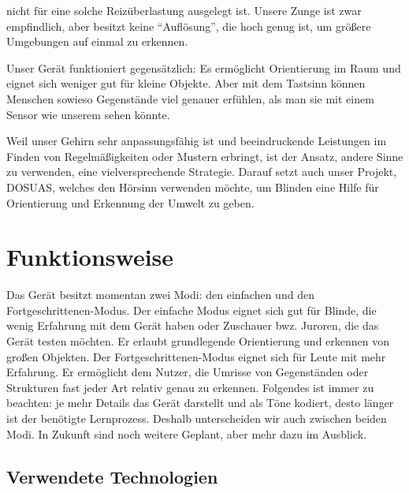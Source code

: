 \documentclass[a4paper,12pt,ngerman]{scrartcl}
\begin{document}
nicht für eine solche Reizüberlastung ausgelegt ist. Unsere Zunge ist zwar empfindlich, aber besitzt keine
\enquote{Auflösung}, die hoch genug ist, um größere Umgebungen auf einmal zu erkennen.\par 
Unser Gerät funktioniert gegensätzlich: Es ermöglicht 
Orientierung im Raum und eignet sich weniger gut für kleine Objekte. Aber mit dem Tastsinn können Menschen
sowieso Gegenstände viel genauer erfühlen, als man sie mit einem Sensor wie unserem sehen könnte.\par
Weil unser Gehirn sehr anpassungsfähig ist und beeindruckende
Leistungen im Finden von Regelmäßigkeiten oder Mustern erbringt, ist der Ansatz,
andere Sinne zu verwenden, eine vielversprechende Strategie. Darauf setzt auch 
unser Projekt, DOSUAS, welches den Hörsinn verwenden möchte, um Blinden eine Hilfe
für Orientierung und Erkennung der Umwelt zu geben.

\newpage

\section{Funktionsweise}

Das Gerät besitzt momentan zwei Modi: den einfachen und den Fortgeschrittenen-Modus. Der einfache Modus 
eignet sich gut für Blinde, die wenig Erfahrung mit dem Gerät haben oder Zuschauer bwz. Juroren, die das
Gerät testen möchten. Er erlaubt grundlegende Orientierung und erkennen von großen Objekten. Der
Fortgeschrittenen-Modus eignet sich für Leute mit mehr Erfahrung. Er ermöglicht dem Nutzer, die Umrisse von 
Gegenständen oder Strukturen fast jeder Art relativ genau zu erkennen. Folgendes ist immer zu beachten: 
je mehr Details das Gerät darstellt und als Töne kodiert, desto länger ist der benötigte Lernprozess. 
Deshalb unterscheiden wir auch zwischen beiden Modi. In Zukunft sind noch weitere Geplant, aber mehr dazu im 
Ausblick.

\subsection{Verwendete Technologien}
\end{document}
